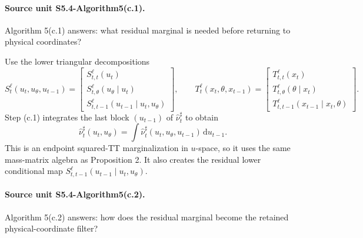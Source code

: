 \documentclass[11pt]{article}
\newcommand{\dd}{\,\mathrm d}
\begin{document}
\paragraph{Source unit S5.4-Algorithm5(c.1).}
Algorithm 5(c.1) answers: what residual marginal is needed before returning to
physical coordinates?

Use
the lower triangular decompositions
\[
    S_t^{\ell}(u_t,u_\theta,u_{t-1})
    =
    \begin{bmatrix}
    S_{t,t}^{\ell}(u_t)\\
    S_{t,\theta}^{\ell}(u_\theta\mid u_t)\\
    S_{t,t-1}^{\ell}(u_{t-1}\mid u_t,u_\theta)
    \end{bmatrix},
    \qquad
    T_t^{\ell}(x_t,\theta,x_{t-1})
    =
    \begin{bmatrix}
    T_{t,t}^{\ell}(x_t)\\
    T_{t,\theta}^{\ell}(\theta\mid x_t)\\
    T_{t,t-1}^{\ell}(x_{t-1}\mid x_t,\theta)
    \end{bmatrix}.
    \tag{P14}
\]
Step (c.1) integrates the last block \((u_{t-1})\) of
\(\widehat\nu_t^\sharp\) to obtain
\[
    \widehat\nu_t^\sharp(u_t,u_\theta)
    =
    \int\widehat\nu_t^\sharp(u_t,u_\theta,u_{t-1})\dd u_{t-1}.
    \tag{P15}
\]
This is an endpoint squared-TT marginalization in \(u\)-space, so it uses the
same mass-matrix algebra as Proposition 2.  It also creates the residual lower
conditional map \(S_{t,t-1}^{\ell}(u_{t-1}\mid u_t,u_\theta)\).

\paragraph{Source unit S5.4-Algorithm5(c.2).}
Algorithm 5(c.2) answers: how does the residual marginal become the retained
physical-coordinate filter?
\end{document}
